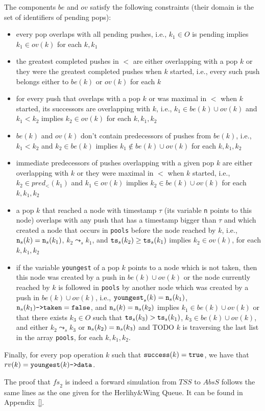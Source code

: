 The components $be$ and $ov$ satisfy the following constraints (their domain is the set of identifiers of pending pops):
\vspace{-2mm}
\begin{itemize}
	\item every pop overlaps with all pending pushes, i.e., $k_1\in O$ is pending implies $k_1\in ov(k)$ for each $k, k_1$
	\item the greatest completed pushes in $<$ are either overlapping with a pop $k$ or they were the greatest completed pushes when $k$ started, i.e., every such push belongs either to $be(k)$ or $ov(k)$ for each $k$
	\item for every push that overlaps with a pop $k$ or was maximal in $<$ when $k$ started, its successors are overlapping with $k$, i.e., $k_1\in be(k)\cup ov(k)$ and $k_1 < k_2$ implies $k_2 \in ov(k)$ for each $k, k_1, k_2$
	\item $be(k)$ and $ov(k)$ don't contain predecessors of pushes from $be(k)$, i.e., $k_1 < k_2$ and $k_2 \in be(k)$ implies $k_1\not\in be(k)\cup ov(k)$ for each $k, k_1, k_2$
	\item immediate predecessors of pushes overlapping with a given pop $k$ are either overlapping with $k$ or they were maximal in $<$ when $k$ started, i.e., $k_2\in pred_{<}(k_1)$ and $k_1\in ov(k)$ implies $k_2\in be(k)\cup ov(k)$ for each $k,k_1,k_2$
	\item a pop $k$ that reached a node with timestamp $\tau$ (its variable {\tt n} points to this node) overlaps with any push that has a timestamp bigger than $\tau$ and which created a node that occurs in {\tt pools} before the node reached by $k$, i.e., ${\tt n}_s(k)={\tt n}_s(k_1)$, $k_2\leadsto_s k_1$, and ${\tt ts}_s(k_2) \geq {\tt ts}_s(k_1)$ implies $k_2\in ov(k)$, for each $k, k_1, k_2$
	\item if the variable {\tt youngest} of a pop $k$ points to a node which is not taken, then this node was created by a push in $be(k)\cup ov(k)$ or the node currently reached by $k$ is followed in {\tt pools} by another node which was created by a push in $be(k)\cup ov(k)$, i.e., ${\tt youngest}_s(k)={\tt n}_s(k_1)$, ${\tt n}_s(k_1)\text{{\tt ->taken}}={\tt false}$, and ${\tt n}_s(k)={\tt n}_s(k_2)$ implies $k_1\in be(k)\cup ov(k)$ or that there exists $k_3\in O$ such that ${\tt ts}_s(k_3) > {\tt ts}_s(k_1)$, $k_3\in be(k)\cup ov(k)$, and either $k_2\leadsto_s k_3$ or ${\tt n}_s(k_2)={\tt n}_s(k_3)$ and TODO $k$ is traversing the last list in the array {\tt pools}, for each $k, k_1,k_2$.
\vspace{-2mm}
\end{itemize}
Finally, for every pop operation $k$ such that ${\tt success}(k)={\tt true}$, we have that $rv(k)={\tt youngest}(k)\text{\tt->data}$. 

The proof that $\mathit{fs}_2$ is indeed a forward simulation from $\mathit{TSS}$ to $AbsS$ follows the same lines as the one given for the Herlihy\&Wing Queue. It can be found in Appendix~\ref{}.








